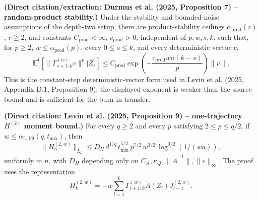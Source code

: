 \begin{lemma}\label{lem:product-stability-input}
  \textbf{(Direct citation/extraction: Durmus et al. (2025, Proposition 7) --
  random-product stability.)}
  Under the stability and bounded-noise assumptions of the depth-two setup,
  there are product-stability ceilings $\alpha_{\mathrm{prod}}(r)$, $r \ge 2$, and
  constants $C_{\mathrm{prod}} < \infty$, $c_{\mathrm{prod}} > 0$, independent of
  $p,w,s,k$, such that, for $p \ge 2$, $w \le \alpha_{\mathrm{prod}}(p)$, every
  $0 \le s \le k$, and every deterministic vector $v$,
  \begin{equation}
\mathbb{E}^{\frac{1}{p}} \left[ \lVert \Gamma_{s + 1:k}^{(w)} v \rVert^{p} | Z_{s} \right]
    \le C_{\mathrm{prod}} \exp\left(- \frac{c_{\mathrm{prod}} w a (k - s)}{p}\right) \lVert v \rVert.
\label{eq:product-stability-input}
\end{equation}
  This is the constant-step deterministic-vector form used in Levin et al.
  (2025, Appendix D.1, Proposition 9); the displayed exponent is weaker than
  the source bound and is sufficient for the burn-in transfer.
\end{lemma}

\begin{lemma}\label{lem:levin-prop-9}
  \textbf{(Direct citation: Levin et al. (2025, Proposition 9) -- one-trajectory
  $H^{(2)}$ moment bound.)}
  For every $q \ge 2$ and every $p$ satisfying $2 \le p \le q / 2$, if
  $w \le \alpha_{\mathrm{L,P9}}(q,t_{\mathrm{mix}})$, then
  \[
\lVert H_{n}^{(2, w)} \rVert_{L_{p}}
    \le D_{H} \, d^{1 / q} \, t_{\mathrm{mix}}^{5 / 2} \, p^{7 / 2}
       \, w^{3 / 2} \, \log^{3 / 2}(1 / (w a)),
\]
  uniformly in $n$, with $D_{H}$ depending only on
  $C_{A}, \kappa_{Q}, \lVert \overline{A}^{-1} \rVert, \lVert \varepsilon \rVert_{\infty}$.
  The proof uses the representation
  \begin{equation}
H_{k}^{(2,w)}
    = - w \sum_{l = 1}^{k} \Gamma_{l + 1:k}^{(w)}
          \tilde{A}(Z_{l}) J_{l - 1}^{(2,w)}.
\label{eq:levin-H2-representation}
\end{equation}
\end{lemma}


